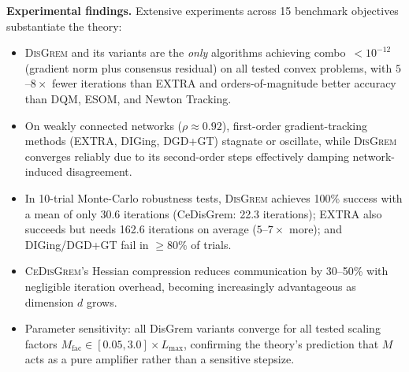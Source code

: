 \documentclass[11pt,a4paper]{article}
\begin{document}
	\noindent\textbf{Experimental findings.}
	Extensive experiments across 15 benchmark objectives substantiate the theory:
	\begin{itemize}[leftmargin=1.2em,itemsep=2pt]
		\item \textsc{DisGrem} and its variants are the \emph{only} algorithms achieving
		combo~$<10^{-12}$ (gradient norm plus consensus residual) on all tested convex problems,
		with $5$--$8\times$ fewer iterations than EXTRA and orders-of-magnitude better accuracy
		than DQM, ESOM, and Newton Tracking.
		\item On weakly connected networks ($\rho\approx 0.92$), first-order gradient-tracking methods
		(EXTRA, DIGing, DGD+GT) stagnate or oscillate, while \textsc{DisGrem} converges
		reliably due to its second-order steps effectively damping network-induced disagreement.
		\item In 10-trial Monte-Carlo robustness tests, \textsc{DisGrem} achieves 100\% success
		with a mean of only 30.6 iterations (CeDisGrem: 22.3 iterations);
		EXTRA also succeeds but needs 162.6 iterations on average ($5$--$7\times$ more);
		and DIGing/DGD+GT fail in $\ge80\%$ of trials.
		\item \textsc{CeDisGrem}'s Hessian compression reduces communication by 30--50\% with
		negligible iteration overhead, becoming increasingly advantageous as dimension $d$ grows.
		\item Parameter sensitivity: all DisGrem variants converge for all tested scaling factors
		$M_\mathrm{fac}\in[0.05, 3.0]\times L_{\max}$, confirming the theory's prediction that
		$M$ acts as a pure amplifier rather than a sensitive stepsize.
	\end{itemize}
	
\end{document}

